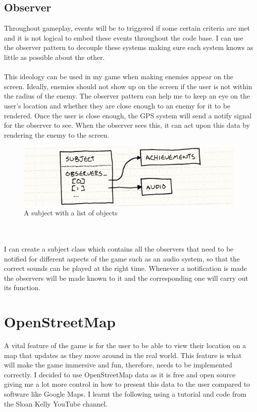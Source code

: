\documentclass[a4paper]{report}
\begin{document}
\subsection{Observer}
Throughout gameplay, events will be to triggered if some certain criteria are met and it is not logical to embed these events throughout the code base. I can use the observer pattern to decouple these systems making sure each system knows as little as possible about the other. 
\\\\
This ideology can be used in my game when making enemies appear on the screen. Ideally, enemies should not show up on the screen if the user is not within the radius of the enemy. The observer pattern can help me to keep an eye on the user’s location and whether they are close enough to an enemy for it to be rendered. Once the user is close enough, the GPS system will send a notify signal for the observer to see. When the observer sees this, it can act upon this data by rendering the enemy to the screen.
\begin{figure}[h]
	\centering
	\includegraphics[scale=0.55]{observer-list}
	\caption{A subject with a list of objects \cite{GPP}}
\end{figure}
\\\\
I can create a subject class which contains all the observers that need to be notified for different aspects of the game such as an audio system, so that the correct sounds can be played at the right time. Whenever a notification is made the observers will be made known to it and the corresponding one will carry out its function. \cite{GPP}

\section{OpenStreetMap}
A vital feature of the game is for the user to be able to view their location on a map that updates as they move around in the real world. This feature is what will make the game immersive and fun, therefore, needs to be implemented correctly. I decided to use OpenStreetMap data as it is free and open source giving me a lot more control in how to present this data to the user compared to software like Google Maps. I learnt the following using a tutorial and code from the Sloan Kelly YouTube channel. \cite{Sloan}
\end{document}
